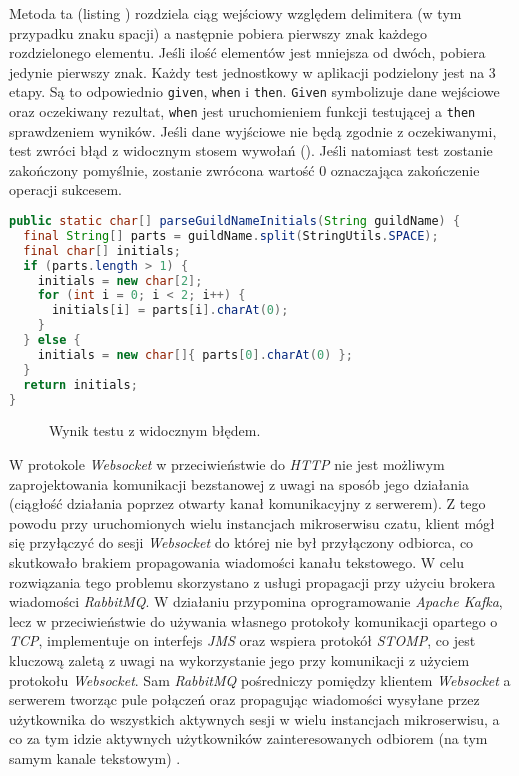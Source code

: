 Metoda ta (listing ) rozdziela ciąg wejściowy względem delimitera (w tym przypadku znaku spacji)
a następnie pobiera pierwszy znak każdego rozdzielonego elementu. Jeśli ilość elementów jest mniejsza od dwóch, pobiera
jedynie pierwszy znak. Każdy test jednostkowy w aplikacji podzielony jest na 3 etapy. Są to odpowiednio \verb|given|,
\verb|when| i \verb|then|. \verb|Given| symbolizuje dane wejściowe oraz oczekiwany rezultat, \verb|when| jest
uruchomieniem funkcji testującej a \verb|then| sprawdzeniem wyników. Jeśli dane wyjściowe nie będą zgodnie z
oczekiwanymi, test zwróci błąd z widocznym stosem wywołań (). Jeśli natomiast test zostanie
zakończony pomyślnie, zostanie zwrócona wartość 0 oznaczająca zakończenie operacji sukcesem.
%
\begin{lstlisting}[language=Java,label={lis:java-method},caption={Ciało metody \texttt{parseGuildNameInitials()}.}]
public static char[] parseGuildNameInitials(String guildName) {
  final String[] parts = guildName.split(StringUtils.SPACE);
  final char[] initials;
  if (parts.length > 1) {
    initials = new char[2];
    for (int i = 0; i < 2; i++) {
      initials[i] = parts[i].charAt(0);
    }
  } else {
    initials = new char[]{ parts[0].charAt(0) };
  }
  return initials;
}
\end{lstlisting}
%
\begin{figure}[H]
  \centering
  \caption{Wynik testu z widocznym błędem.}
  \label{fig:junit-error}
\end{figure}



W protokole \textit{Websocket} w przeciwieństwie do \textit{HTTP} nie jest możliwym zaprojektowania komunikacji
bezstanowej z uwagi na sposób jego działania (ciągłość działania poprzez otwarty kanał komunikacyjny z serwerem). Z tego
powodu przy uruchomionych wielu instancjach mikroserwisu czatu, klient mógł się przyłączyć do sesji \textit{Websocket}
do której nie był przyłączony odbiorca, co skutkowało brakiem propagowania wiadomości kanału tekstowego. W celu
rozwiązania tego problemu skorzystano z usługi propagacji przy użyciu brokera wiadomości \textit{RabbitMQ}. W działaniu
przypomina oprogramowanie \textit{Apache Kafka}, lecz w przeciwieństwie do używania własnego protokoły komunikacji
opartego o \textit{TCP}, implementuje on interfejs \textit{JMS} oraz wspiera protokół \textit{STOMP}, co jest kluczową
zaletą z uwagi na wykorzystanie jego przy komunikacji z użyciem protokołu \textit{Websocket}. Sam \textit{RabbitMQ}
pośredniczy pomiędzy klientem \textit{Websocket} a serwerem tworząc pule połączeń oraz propagując wiadomości wysyłane
przez użytkownika do wszystkich aktywnych sesji w wielu instancjach mikroserwisu, a co za tym idzie aktywnych
użytkowników zainteresowanych odbiorem (na tym samym kanale tekstowym) \cite{bib:real-time-app-scaling}.
